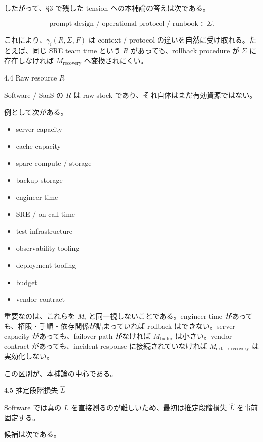\documentclass[12pt,a4paper]{article}
\begin{document}
したがって、§3 で残した tension への本補論の答えは次である。

\[
\text{prompt design / operational protocol / runbook} \in \Sigma.
\]

これにより、\(\gamma_i(R,\Sigma,F)\) は context / protocol の違いを自然に受け取れる。たとえば、同じ SRE team time という \(R\) があっても、rollback procedure が \(\Sigma\) に存在しなければ \(M_{\mathrm{recovery}}\) へ変換されにくい。

4.4 Raw resource \(R\)

Software / SaaS の \(R\) は raw stock であり、それ自体はまだ有効資源ではない。

例として次がある。

\begin{itemize}
\tightlist
\item
  server capacity
\item
  cache capacity
\item
  spare compute / storage
\item
  backup storage
\item
  engineer time
\item
  SRE / on-call time
\item
  test infrastructure
\item
  observability tooling
\item
  deployment tooling
\item
  budget
\item
  vendor contract
\end{itemize}

重要なのは、これらを \(M_i\) と同一視しないことである。engineer time があっても、権限・手順・依存関係が詰まっていれば rollback はできない。server capacity があっても、failover path がなければ \(M_{\mathrm{buffer}}\) は小さい。vendor contract があっても、incident response に接続されていなければ \(M_{\mathrm{ext}\to\mathrm{recovery}}\) は実効化しない。

この区別が、本補論の中心である。

4.5 推定段階損失 \(\hat L\)

Software では真の \(L\) を直接測るのが難しいため、最初は推定段階損失 \(\hat L\) を事前固定する。

候補は次である。
\end{document}
